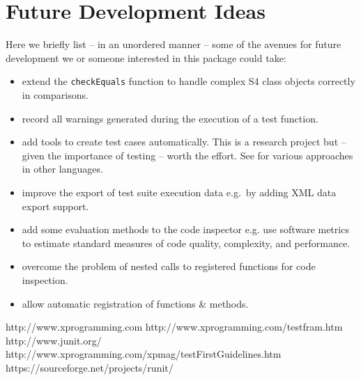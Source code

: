\documentclass[12pt, a4paper]{article}
\begin{document}
\section{Future Development Ideas}
Here we briefly list -- in an unordered manner -- some of the avenues for future development we or someone interested in this package could take:
\begin{itemize}
\item{extend the {\tt checkEquals} function to handle complex S4 class objects correctly in comparisons.}
\item{record all warnings generated during the execution of a test function.}
\item{add tools to create test cases automatically. This is a research project but -- given the importance of testing -- worth the effort. See \cite{junit} for various approaches in other languages.}
\item{improve the export of test suite execution data e.g.\ by adding XML data export support.}
\item{add some evaluation methods to the code inspector e.g. use software metrics to estimate standard measures of code quality, complexity, and performance.}
\item{overcome the problem of nested calls to registered functions for code inspection.}
\item{allow automatic registration of functions \& methods.}
\end{itemize}

\begin{thebibliography}{99}
% 
 http://www.xprogramming.com
 http://www.xprogramming.com/testfram.htm
 http://www.junit.org/
 http://www.xprogramming.com/xpmag/testFirstGuidelines.htm
 https://sourceforge.net/projects/runit/
\end{thebibliography}
\end{document}
